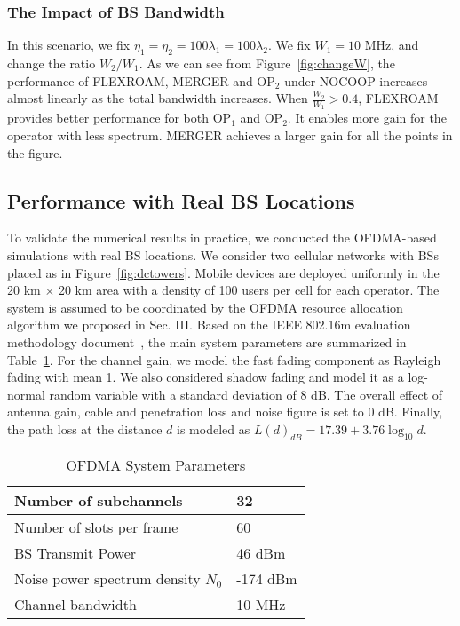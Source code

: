 \documentclass[conference]{IEEEtran}
\begin{document}
\subsubsection{The Impact of BS Bandwidth}

In this scenario, we fix $\eta_1 = \eta_2 = 100\lambda_1 = 100\lambda_2$. We fix $W_1 = 10$ MHz, and change the ratio $W_2 / W_1$. As we can see from Figure~\ref{fig:changeW}, the performance of FLEXROAM, MERGER and OP$_2$ under NOCOOP increases almost linearly as the total bandwidth increases. When $\frac{W_2}{W_1} > 0.4$, FLEXROAM provides better performance for both OP$_1$ and OP$_2$. It enables more gain for the operator with less spectrum. MERGER achieves a larger gain for all the points in the figure.

\subsection{Performance with Real BS Locations}

To validate the numerical results in practice, we conducted the OFDMA-based simulations with real BS locations. We consider two cellular networks with BSs placed as in Figure~\ref{fig:dctowers}. Mobile devices are deployed uniformly in the 20 km $\times$ 20 km area with a density of 100 users per cell for each operator. The system is assumed to be coordinated by the OFDMA resource allocation algorithm we proposed in Sec. III. Based on the IEEE 802.16m evaluation methodology document~\cite{WiMAXEva}, the main system parameters are summarized in Table~\ref{table:ofdmapara}. For the channel gain, we model the fast fading component as Rayleigh fading with mean 1. We also considered shadow fading and model it as a log-normal random variable with a standard deviation of 8 dB. The overall effect of antenna gain, cable and penetration loss and noise figure is set to 0 dB. Finally, the path loss at the distance $d$ is modeled as $L(d)_{dB} = 17.39 + 3.76\log_{10}d$.
\begin{table}[!t]
\caption{OFDMA System Parameters}
\label{table:ofdmapara}
\centering
\begin{tabular}{ p{5.5cm} | l }
\hline
Number of subchannels & 32 \\
\hline
Number of slots per frame & 60 \\
\hline
BS Transmit Power & 46 dBm \\
\hline
Noise power spectrum density $N_0$ & -174 dBm \\
\hline
Channel bandwidth & 10 MHz \\
\hline
\end{tabular}
\vspace{-0.2in}
\end{table}
\end{document}
